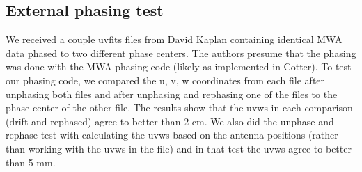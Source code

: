 \documentclass[11pt, oneside]{article}   	%
\begin{document}
\subsection{External phasing test}
We received a couple uvfits files from David Kaplan containing identical MWA data phased to two different phase centers. The authors presume that the phasing was done with the MWA phasing code (likely as implemented in Cotter). To test our phasing code, we compared the u, v, w coordinates from each file after unphasing both files and after unphasing and rephasing one of the files to the phase center of the other file. The results show that the uvws in each comparison (drift and rephased) agree to better than 2 cm. We also did the unphase and rephase test with calculating the uvws based on the antenna positions (rather than working with the uvws in the file) and in that test the uvws agree to better than 5 mm. 
\end{document}
